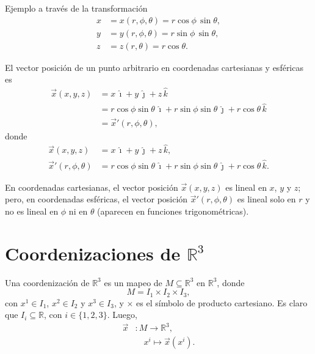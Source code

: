 \documentclass[../apunte_mecanica_clasica.tex]{subfiles}%
\begin{document}
\begin{apuntebloque}{Ejemplo}
a través de la transformación
\begin{align*}
x &= x(r,\phi,\theta)=r\cos\phi\,\sin\theta,\\
y &= y(r,\phi,\theta)=r\sin\phi\,\sin\theta,\\
z &= z(r,\theta)=r\cos\theta.
\end{align*}

El vector posición de un punto arbitrario en coordenadas cartesianas y esféricas es
\begin{align*}
\vec{x}(x,y,z)&=x\,\hat{\imath}+y\,\hat{\jmath}+z\,\hat{k}\\[4pt]
&= r\cos\phi\sin\theta\,\hat{\imath}+r\sin\phi\sin\theta\,\hat{\jmath}+r\cos\theta\,\hat{k}\\[4pt]
&= \vec{x}'(r,\phi,\theta),
\end{align*}
donde
\begin{align*}
\vec{x}(x,y,z)&=x\,\hat{\imath}+y\,\hat{\jmath}+z\,\hat{k},\\[4pt]
\vec{x}'(r,\phi,\theta)&=r\cos\phi\sin\theta\,\hat{\imath}+r\sin\phi\sin\theta\,\hat{\jmath}+r\cos\theta\,\hat{k}.
\end{align*}

En coordenadas cartesianas, el vector posición $\vec{x}(x,y,z)$ es lineal en $x$, $y$ y $z$; pero, en coordenadas esféricas, el vector posición $\vec{x}'(r,\phi,\theta)$ es lineal solo en $r$ y no es lineal en $\phi$ ni en $\theta$ (aparecen en funciones trigonométricas).

\end{apuntebloque}

\newpage


\section{Coordenizaciones de $\mathbb{R}^3$}

Una coordenización de $\mathbb{R}^3$ es un mapeo de $M\subseteq \mathbb{R}^3$ en $\mathbb{R}^3$, donde
\begin{equation*}
    M = I_1 \times I_2 \times I_3,
\end{equation*}
con $x^{1}\in I_1$, $x^{2}\in I_2$ y $x^{3}\in I_3$, y $\times$ es el símbolo de producto cartesiano. Es claro que $I_i\subseteq \mathbb{R}$, con $i\in \{1,2,3\}$. Luego,
\begin{align*}
\vec{x} &: M \to \mathbb{R}^3, \\[4pt] &\quad x^{i} \mapsto \vec{x}(x^{i}).
\end{align*}
\end{document}

